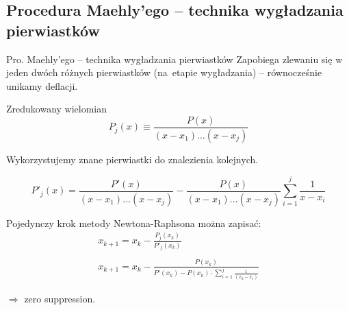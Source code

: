 \subsection{Procedura Maehly'ego -- technika wygładzania pierwiastków}

\begin{frame}{Pro. Maehly'ego -- technika wygładzania pierwiastków}
  Zapobiega zlewaniu się w jeden dwóch różnych pierwiastków (na~etapie wygładzania) -- równocześnie unikamy deflacji.\\

  \begin{block}{Zredukowany wielomian}
    $$P_j(x) \equiv \frac{P(x)}{(x - x_1)\ldots(x - x_j)}$$
  \end{block}
    Wykorzystujemy znane pierwiastki do znalezienia kolejnych.

  $$P'_j(x) = \frac{P'(x)}{(x - x_1)\ldots(x - x_j)} - \frac{P(x)}{(x - x_1)\ldots(x - x_j)} \sum_{i=1}^j \frac{1}{x - x_i}$$
\end{frame}

\begin{frame}
  Pojedynczy krok metody Newtona-Raphsona można zapisać:
  \begin{gather*}
    x_{k+1} = x_k - \frac{P_j(x_k)}{P'_j(x_k)}\\ \\
    x_{k+1} = x_k - \frac{P(x_k)}{P'(x_k) - P(x_k) \cdot \sum_{i=1}^{j}\frac{1}{(x_k - x_i)}}
  \end{gather*}

  $\Rightarrow$ zero suppression.
\end{frame}
